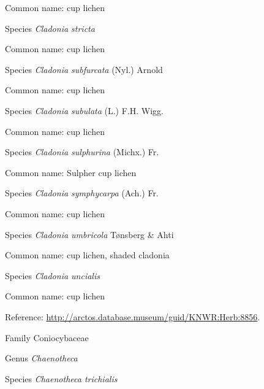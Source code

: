 \documentclass[9pt, article]{memoir}
\begin{document}
\begin{multicols}{2}
Common name: cup lichen

\vspace{6pt}\noindent\hspace{36pt}Species \textit{Cladonia stricta}


Common name: cup lichen

\vspace{6pt}\noindent\hspace{36pt}Species \textit{Cladonia subfurcata} (Nyl.) Arnold


Common name: cup lichen

\vspace{6pt}\noindent\hspace{36pt}Species \textit{Cladonia subulata} (L.) F.H. Wigg.


Common name: cup lichen

\vspace{6pt}\noindent\hspace{36pt}Species \textit{Cladonia sulphurina} (Michx.) Fr.


Common name: Sulpher cup lichen

\vspace{6pt}\noindent\hspace{36pt}Species \textit{Cladonia symphycarpa} (Ach.) Fr.


Common name: cup lichen

\vspace{6pt}\noindent\hspace{36pt}Species \textit{Cladonia umbricola} Tønsberg \& Ahti


Common name: cup lichen, shaded cladonia

\vspace{6pt}\noindent\hspace{36pt}Species \textit{Cladonia uncialis}


Common name: cup lichen

Reference: 
\url{http://arctos.database.museum/guid/KNWR:Herb:8856}.

\vspace{6pt}\noindent\hspace{24pt}Family Coniocybaceae


\vspace{6pt}\noindent\hspace{30pt}Genus \textit{Chaenotheca}


\vspace{6pt}\noindent\hspace{36pt}Species \textit{Chaenotheca trichialis}



\end{multicols}
\end{document}
